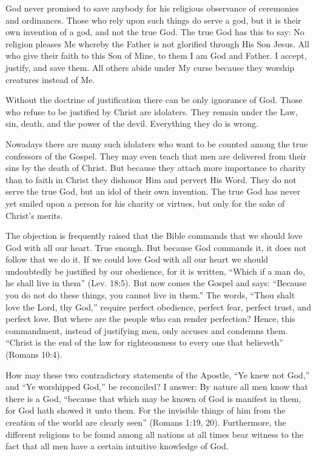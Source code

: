 God never promised to save anybody for his religious observance of ceremonies and ordinances. Those who rely upon such things do serve a god, but it is their own invention of a god, and not the true God. The true God has this to say: No religion pleases Me whereby the Father is not glorified through His Son Jesus. All who give their faith to this Son of Mine, to them I am God and Father. I accept, justify, and save them. All others abide under My curse because they worship creatures instead of Me.

Without the doctrine of justification there can be only ignorance of God. Those who refuse to be justified by Christ are idolaters. They remain under the Law, sin, death, and the power of the devil. Everything they do is wrong.

Nowadays there are many such idolaters who want to be counted among the true confessors of the Gospel. They may even teach that men are delivered from their sins by the death of Christ. But because they attach more importance to charity than to faith in Christ they dishonor Him and pervert His Word. They do not serve the true God, but an idol of their own invention. The true God has never yet smiled upon a person for his charity or virtues, but only for the sake of Christ’s merits.

The objection is frequently raised that the Bible commands that we should love God with all our heart. True enough. But because God commands it, it does not follow that we do it. If we could love God with all our heart we should undoubtedly be justified by our obedience, for it is written, “Which if a man do, he shall live in them” (Lev. 18:5). But now comes the Gospel and says: “Because you do not do these things, you cannot live in them.” The words, “Thou shalt love the Lord, thy God,” require perfect obedience, perfect fear, perfect trust, and perfect love. But where are the people who can render perfection? Hence, this commandment, instead of justifying men, only accuses and condemns them. “Christ is the end of the law for righteousness to every one that believeth” (Romans 10:4).

How may these two contradictory statements of the Apostle, “Ye knew not God,” and “Ye worshipped God,” be reconciled? I answer: By nature all men know that there is a God, “because that which may be known of God is manifest in them, for God hath showed it unto them. For the invisible things of him from the creation of the world are clearly seen” (Romans 1:19, 20). Furthermore, the different religions to be found among all nations at all times bear witness to the fact that all men have a certain intuitive knowledge of God.

